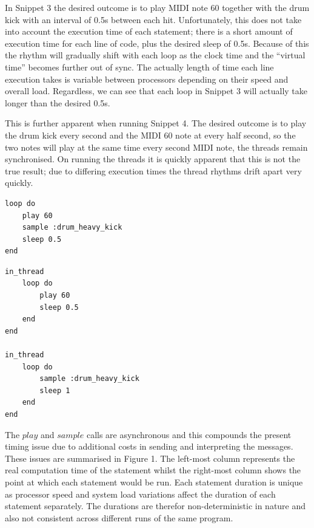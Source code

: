 \documentclass[11pt, abstracton, twoside]{scrartcl}
\begin{document}
\begin{multicols}{2}
In Snippet 3 the desired outcome is to play MIDI note 60 together with the 
drum kick with an interval of 0.5s between each hit. Unfortunately, this does 
not take into account the execution time of each statement; there is a short 
amount of execution time for each line of code, plus the desired sleep of 0.5s.
Because of this the rhythm will gradually shift with each loop as the 
clock time and the ``virtual time'' becomes further out of sync. The 
actually length of time each line execution takes is variable between 
processors depending on their speed and overall load. Regardless, we can see 
that each loop in Snippet 3 will actually take longer than the desired 0.5s.

This is further apparent when running Snippet 4. The desired outcome is to 
play the drum kick every second and the MIDI 60 note at every half second, so 
the two notes will play at the same time every second MIDI note, the threads 
remain synchronised. On running the threads it is quickly apparent that this 
is not the true result; due to differing execution times the thread rhythms 
drift apart very quickly.

	\begin{minipage}{0.5\textwidth}

		\begin{minipage}{\textwidth}
			\begin{lstlisting}[style = sonicpi]
loop do
    play 60
    sample :drum_heavy_kick
    sleep 0.5
end
			\end{lstlisting}
		\end{minipage}

		\begin{minipage}{\textwidth}
			\begin{lstlisting}[style = sonicpi]
in_thread
    loop do
        play 60
        sleep 0.5
    end
end

in_thread
    loop do
        sample :drum_heavy_kick
        sleep 1
    end
end
			\end{lstlisting}
		\end{minipage}

	\end{minipage}

\end{multicols}

The $play$ and $sample$ calls are asynchronous and this compounds the present 
timing issue due to additional costs in sending and interpreting the messages. 
These issues are summarised in Figure 1. The left-most column represents the 
real computation time of the statement whilst the right-most column shows the 
point at which each statement would be run. Each statement duration is unique 
as processor speed and system load variations affect the duration of each 
statement separately. The durations are therefor non-deterministic in nature 
and also not consistent across different runs of the same program.
\end{document}
